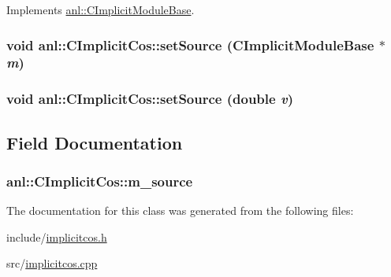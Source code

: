 Implements \hyperlink{classanl_1_1CImplicitModuleBase_ab88f8a1822dcfbc13ba5230318b0acd1}{anl::CImplicitModuleBase}.\hypertarget{classanl_1_1CImplicitCos_a18391bf191ac76b44dfdb0850b95d764}{
\subsubsection[{setSource}]{\setlength{\rightskip}{0pt plus 5cm}void anl::CImplicitCos::setSource ({\bf CImplicitModuleBase} $\ast$ {\em m})}}
\label{classanl_1_1CImplicitCos_a18391bf191ac76b44dfdb0850b95d764}
\hypertarget{classanl_1_1CImplicitCos_ad1ead16f74e1d5d914d09a09ee6a70b1}{
\subsubsection[{setSource}]{\setlength{\rightskip}{0pt plus 5cm}void anl::CImplicitCos::setSource (double {\em v})}}
\label{classanl_1_1CImplicitCos_ad1ead16f74e1d5d914d09a09ee6a70b1}


\subsection{Field Documentation}
\hypertarget{classanl_1_1CImplicitCos_a3a07d5f761cc56b9aece0d9159ea574c}{
\subsubsection[{m\_\-source}]{ {\bf anl::CImplicitCos::m\_\-source}}}
\label{classanl_1_1CImplicitCos_a3a07d5f761cc56b9aece0d9159ea574c}


The documentation for this class was generated from the following files:\begin{DoxyCompactItemize}
\item 
include/\hyperlink{implicitcos_8h}{implicitcos.h}\item 
src/\hyperlink{implicitcos_8cpp}{implicitcos.cpp}\end{DoxyCompactItemize}
